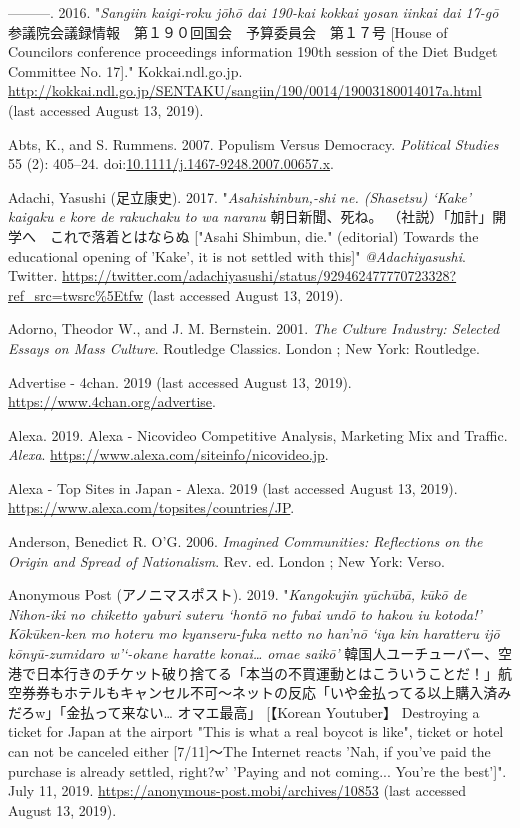 \documentclass[10pt,british,A4paper,oneside]{memoir}
\begin{document}
\hypertarget{ref-abe_house_2016}{}
---------. 2016. "\emph{Sangiin kaigi-roku jōhō dai 190-kai kokkai yosan iinkai dai 17-gō} 参議院会議録情報　第１９０回国会　予算委員会　第１７号 [House of Councilors conference proceedings information 190th session of the Diet Budget Committee No. 17]." Kokkai.ndl.go.jp.
\url{http://kokkai.ndl.go.jp/SENTAKU/sangiin/190/0014/19003180014017a.html} (last accessed August 13, 2019).

\hypertarget{ref-abts_populism_2007}{}
Abts, K., and S. Rummens. 2007. Populism Versus Democracy.
\emph{Political Studies} 55 (2): 405--24.
doi:\href{https://doi.org/10.1111/j.1467-9248.2007.00657.x}{10.1111/j.1467-9248.2007.00657.x}.

\hypertarget{ref-adachi_eng._2017}{}
Adachi, Yasushi (足立康史). 2017. "\emph{Asahishinbun,-shi ne. (Shasetsu) `Kake' kaigaku e kore de rakuchaku to wa naranu} 朝日新聞、死ね。 （社説）「加計」開学へ　これで落着とはならぬ ["Asahi Shimbun, die." (editorial) Towards the educational opening of 'Kake', it is not settled with this]"
\emph{@Adachiyasushi}. Twitter.
\url{https://twitter.com/adachiyasushi/status/929462477770723328?ref_src=twsrc\%5Etfw} (last accessed August 13, 2019).

\hypertarget{ref-adorno_culture_2001}{}
Adorno, Theodor W., and J. M. Bernstein. 2001. \emph{The Culture
Industry: Selected Essays on Mass Culture}. Routledge Classics. London ;
New York: Routledge.

\hypertarget{ref-noauthor_advertise_nodate}{}
Advertise - 4chan. 2019 (last accessed August 13, 2019).
\url{https://www.4chan.org/advertise}.

\hypertarget{ref-alexa_alexa_2019}{}
Alexa. 2019. Alexa - Nicovideo Competitive Analysis, Marketing Mix and
Traffic. \emph{Alexa}.
\url{https://www.alexa.com/siteinfo/nicovideo.jp}.

\hypertarget{ref-noauthor_alexa_2019}{}
Alexa - Top Sites in Japan - Alexa. 2019 (last accessed August 13, 2019).
\url{https://www.alexa.com/topsites/countries/JP}.

\hypertarget{ref-anderson_imagined_2006}{}
Anderson, Benedict R. O'G. 2006. \emph{Imagined Communities: Reflections
on the Origin and Spread of Nationalism}. Rev. ed. London ; New York:
Verso.

\hypertarget{ref-anonymous_post_eng._2019}{}
Anonymous Post (アノニマスポスト). 2019. "\emph{Kangokujin yūchūbā, kūkō de Nihon-iki no chiketto yaburi suteru `hontō no fubai undō to hakou iu kotoda!' Kōkūken-ken mo hoteru mo kyanseru-fuka netto no han'nō `iya kin haratteru ijō kōnyū-zumidaro w'`-okane haratte konai… omae saikō'} 韓国人ユーチューバー、空港で日本行きのチケット破り捨てる「本当の不買運動とはこういうことだ！」航空券券もホテルもキャンセル不可～ネットの反応「いや金払ってる以上購入済みだろw」「金払って来ない… オマエ最高」 [【Korean Youtuber】 Destroying a ticket for Japan at the airport "This is what a real boycot is like", ticket or hotel can not be canceled either [7/11]～The Internet reacts 'Nah, if you've paid the purchase is already settled, right?w' 'Paying and not coming... You're the best']". July 11, 2019.
\url{https://anonymous-post.mobi/archives/10853} (last accessed August 13, 2019).
\end{document}
